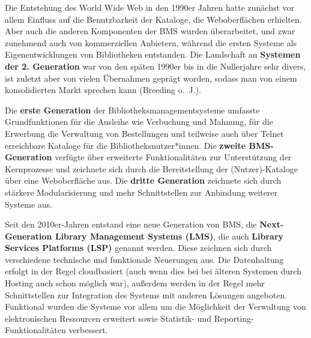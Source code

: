 \documentclass[
  11pt,
  letterpaper,
  DIV=11,
  twoside]{scrreprt}
\begin{document}
Die Entstehung des World Wide Web in den 1990er Jahren hatte zunächst
vor allem Einfluss auf die Benutzbarkeit der Kataloge, die
Weboberflächen erhielten. Aber auch die anderen Komponenten der BMS
wurden überarbeitet, und zwar zunehmend auch von kommerziellen
Anbietern, während die ersten Systeme als Eigenentwicklungen von
Bibliotheken entstanden. Die Landschaft an \textbf{Systemen der 2.
Generation} war von den späten 1990er bis in die Nullerjahre sehr
divers, ist zuletzt aber von vielen Übernahmen geprägt worden, sodass
man von einem konsolidierten Markt sprechen kann (Breeding o.~J.).

\begin{tcolorbox}[enhanced jigsaw, leftrule=.75mm, toprule=.15mm, left=2mm, opacityback=0, arc=.35mm, colback=white, breakable, colframe=quarto-callout-tip-color-frame, rightrule=.15mm, bottomrule=.15mm]
\begin{minipage}[t]{5.5mm}
\textcolor{quarto-callout-tip-color}{\faLightbulb}
\end{minipage}%
\begin{minipage}[t]{\textwidth - 5.5mm}

Die \textbf{erste Generation} der Bibliotheksmanagementsysteme umfasste
Grundfunktionen für die Ausleihe wie Verbuchung und Mahnung, für die
Erwerbung die Verwaltung von Bestellungen und teilweise auch über Telnet
erreichbare Kataloge für die Bibliotheksnutzer*innen. Die \textbf{zweite
BMS-Generation} verfügte über erweiterte Funktionalitäten zur
Unterstützung der Kernprozesse und zeichnete sich durch die
Bereitstellung der (Nutzer)-Kataloge über eine Weboberfläche aus. Die
\textbf{dritte Generation} zeichnete sich durch stärkere Modularisierung
und mehr Schnittstellen zur Anbindung weiterer Systeme aus.

\end{minipage}%
\end{tcolorbox}

Seit den 2010er-Jahren entstand eine neue Generation von BMS, die
\textbf{Next-Generation Library Management Systems (LMS)}, die auch
\textbf{Library Services Platforms (LSP)} genannt werden. Diese zeichnen
sich durch verschiedene technische und funktionale Neuerungen aus. Die
Datenhaltung erfolgt in der Regel cloudbasiert (auch wenn dies bei bei
älteren Systemen durch Hosting auch schon möglich war), außerdem werden
in der Regel mehr Schnittstellen zur Integration des Systems mit anderen
Lösungen angeboten. Funktional wurden die Systeme vor allem um die
Möglichkeit der Verwaltung von elektronischen Ressourcen erweitert sowie
Statistik- und Reporting-Funktionalitäten verbessert.
\end{document}
